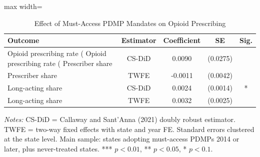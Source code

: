 \begin{table}[htbp]
\centering
\caption{Effect of Must-Access PDMP Mandates on Opioid Prescribing}
\label{tab:main_did}
\begin{adjustbox}{max width=\textwidth}
\begin{tabular}{lcccc}
\toprule
Outcome & Estimator & Coefficient & SE & Sig. \\
\midrule
Opioid prescribing rate (%
Opioid prescribing rate (%
Prescriber share & CS-DiD & 0.0090 & (0.0275) &  \\
Prescriber share & TWFE & -0.0011 & (0.0042) &  \\
Long-acting share & CS-DiD & 0.0024 & (0.0014) & * \\
Long-acting share & TWFE & 0.0032 & (0.0025) &  \\
\bottomrule
\end{tabular}
\end{adjustbox}
\begin{minipage}{0.9\textwidth}
\footnotesize\textit{Notes:} CS-DiD = Callaway and Sant'Anna (2021) doubly robust estimator. TWFE = two-way fixed effects with state and year FE. Standard errors clustered at the state level. Main sample: states adopting must-access PDMPs 2014 or later, plus never-treated states. *** $p<0.01$, ** $p<0.05$, * $p<0.1$.
\end{minipage}
\end{table}
